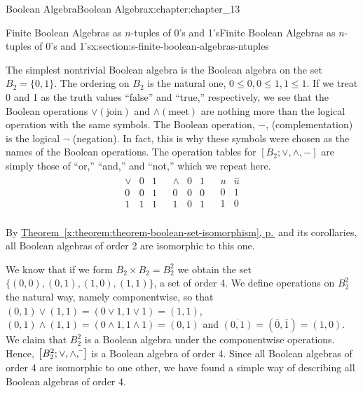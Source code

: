 \documentclass[twoside,10pt,]{book}
\newcommand{\xreffont}{\relax}
\numberwithin{equation}{section}
\begin{document}
\begin{chapterptx}{Boolean Algebra}{}{Boolean Algebra}{}{}{x:chapter:chapter_13}
\begin{sectionptx}{Finite Boolean Algebras as \(n\)-tuples of 0's and 1's}{}{Finite Boolean Algebras as \(n\)-tuples of 0's and 1's}{}{}{x:section:s-finite-boolean-algebras-ntuples}
\par
The simplest nontrivial Boolean algebra is the Boolean algebra on the set \(B_2=\{0, 1\}\). The ordering on \(B_2\) is the natural one, \(0 \leq
0, 0\leq 1, 1\leq 1\). If we treat 0 and 1 as the truth values ``false'' and ``true,'' respectively, we see that the Boolean operations \(\lor (\textrm{join})\) and \(\land (\textrm{meet})\) are nothing more than the logical operation  with the same symbols.  The Boolean operation, \(-\), (complementation) is the logical \(\neg\) (negation). In fact, this is why these symbols were chosen as the names of the Boolean operations. The operation tables for \(\left[B_2;\lor ,\land, - \right]\) are simply those of ``or,'' ``and,'' and ``not,'' which we repeat here.%
\begin{equation*}
\begin{array}{lcr}
\begin{array}{c|cc}
\lor  & 0 & 1 \\
\hline
0 & 0 & 1 \\
1 & 1 & 1 \\
\end{array}  
& 
\begin{array}{c|cc}
\land  & 0 & 1 \\
\hline
0 & 0 & 0 \\
1 & 0 & 1 \\
\end{array}  
&
\begin{array}{c|c}
u & \overset{-}{u} \\
\hline
0 & 1 \\
1 & 0 \\
\end{array}
\end{array}
\end{equation*}
%
\par
By \hyperref[x:theorem:theorem-boolean-set-isomorphism]{Theorem~{\xreffont\ref{x:theorem:theorem-boolean-set-isomorphism}}, p.\,\pageref{x:theorem:theorem-boolean-set-isomorphism}} and its corollaries, all Boolean algebras of order 2 are isomorphic to this one.%
\par
We know that if we form \(B_2\times B_2=B_2^2\) we obtain the set \(\{(0, 0), (0, 1), (1, 0), (1, 1)\}\), a set of order 4. We define operations on \(B_2^2\) the natural way, namely componentwise, so that \((0, 1)\lor (1, 1)=(0\lor 1, 1\lor 1)=(1, 1)\), \((0, 1)\land (1, 1)=(0\land 1, 1\land 1)=(0, 1)\) and \(\overline{(0, 1)} = \left(\bar{0}, \bar{1}\right)=(1, 0)\). We claim that \(B_2^2\) is a Boolean algebra under the componentwise operations. Hence, \(\left[B_2^2; \lor , \land, \bar{}\hspace{3 pt}\right]\) is a Boolean algebra of order 4. Since all Boolean algebras of order 4 are isomorphic to one other, we have found a simple way of describing all Boolean algebras of order 4.%

\end{sectionptx}
\end{chapterptx}
\end{document}

